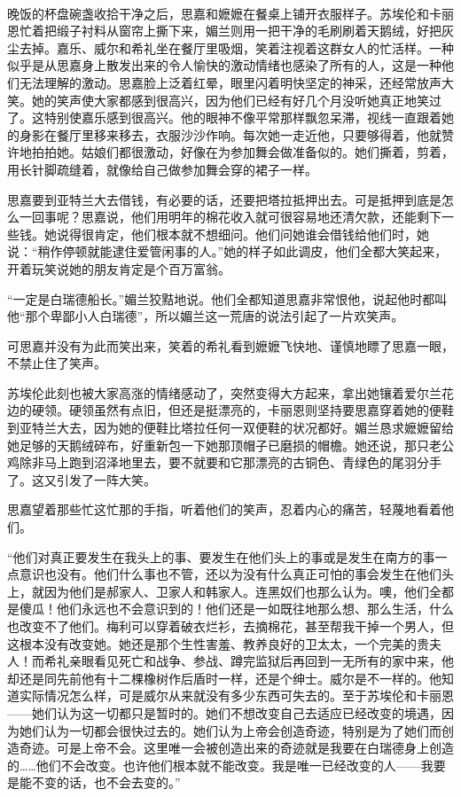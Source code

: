 \par  
\par 晚饭的杯盘碗盏收拾干净之后，思嘉和嬷嬷在餐桌上铺开衣服样子。苏埃伦和卡丽恩忙着把缎子衬料从窗帘上撕下来，媚兰则用一把干净的毛刷刷着天鹅绒，好把灰尘去掉。嘉乐、威尔和希礼坐在餐厅里吸烟，笑着注视着这群女人的忙活样。一种似乎是从思嘉身上散发出来的令人愉快的激动情绪也感染了所有的人，这是一种他们无法理解的激动。思嘉脸上泛着红晕，眼里闪着明快坚定的神采，还经常放声大笑。她的笑声使大家都感到很高兴，因为他们已经有好几个月没听她真正地笑过了。这特别使嘉乐感到很高兴。他的眼神不像平常那样飘忽呆滞，视线一直跟着她的身影在餐厅里移来移去，衣服沙沙作响。每次她一走近他，只要够得着，他就赞许地拍拍她。姑娘们都很激动，好像在为参加舞会做准备似的。她们撕着，剪着，用长针脚疏缝着，就像给自己做参加舞会穿的裙子一样。
\par 思嘉要到亚特兰大去借钱，有必要的话，还要把塔拉抵押出去。可是抵押到底是怎么一回事呢？思嘉说，他们用明年的棉花收入就可很容易地还清欠款，还能剩下一些钱。她说得很肯定，他们根本就不想细问。他们问她谁会借钱给他们时，她说：“稍作停顿就能逮住爱管闲事的人。”她的样子如此调皮，他们全都大笑起来，开着玩笑说她的朋友肯定是个百万富翁。
\par “一定是白瑞德船长。”媚兰狡黠地说。他们全都知道思嘉非常恨他，说起他时都叫他“那个卑鄙小人白瑞德”，所以媚兰这一荒唐的说法引起了一片欢笑声。
\par 可思嘉并没有为此而笑出来，笑着的希礼看到嬷嬷飞快地、谨慎地瞟了思嘉一眼，不禁止住了笑声。
\par 苏埃伦此刻也被大家高涨的情绪感动了，突然变得大方起来，拿出她镶着爱尔兰花边的硬领。硬领虽然有点旧，但还是挺漂亮的，卡丽恩则坚持要思嘉穿着她的便鞋到亚特兰大去，因为她的便鞋比塔拉任何一双便鞋的状况都好。媚兰恳求嬷嬷留给她足够的天鹅绒碎布，好重新包一下她那顶帽子已磨损的帽檐。她还说，那只老公鸡除非马上跑到沼泽地里去，要不就要和它那漂亮的古铜色、青绿色的尾羽分手了。这又引发了一阵大笑。
\par 思嘉望着那些忙这忙那的手指，听着他们的笑声，忍着内心的痛苦，轻蔑地看着他们。
\par “他们对真正要发生在我头上的事、要发生在他们头上的事或是发生在南方的事一点意识也没有。他们什么事也不管，还以为没有什么真正可怕的事会发生在他们头上，就因为他们是郝家人、卫家人和韩家人。连黑奴们也那么认为。噢，他们全都是傻瓜！他们永远也不会意识到的！他们还是一如既往地那么想、那么生活，什么也改变不了他们。梅利可以穿着破衣烂衫，去摘棉花，甚至帮我干掉一个男人，但这根本没有改变她。她还是那个生性害羞、教养良好的卫太太，一个完美的贵夫人！而希礼亲眼看见死亡和战争、参战、蹲完监狱后再回到一无所有的家中来，他却还是同先前他有十二棵橡树作后盾时一样，还是个绅士。威尔是不一样的。他知道实际情况怎么样，可是威尔从来就没有多少东西可失去的。至于苏埃伦和卡丽恩——她们认为这一切都只是暂时的。她们不想改变自己去适应已经改变的境遇，因为她们认为一切都会很快过去的。她们认为上帝会创造奇迹，特别是为了她们而创造奇迹。可是上帝不会。这里唯一会被创造出来的奇迹就是我要在白瑞德身上创造的……他们不会改变。也许他们根本就不能改变。我是唯一已经改变的人——我要是能不变的话，也不会去变的。”

